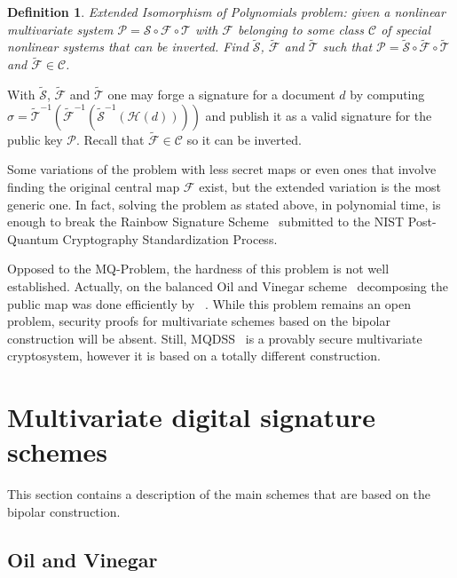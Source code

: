 \documentclass{ufsctex/ufsctex}
\newtheorem{definition}{Definition}
\begin{document}
\begin{definition}
Extended Isomorphism of Polynomials problem: given a nonlinear multivariate
system $\mathcal{P} = \mathcal{S} \circ \mathcal{F} \circ \mathcal{T}$ with
$\mathcal{F}$ belonging to some class $\mathcal{C}$ of special nonlinear
systems that can be inverted. Find $\tilde{\mathcal{S}}$, $\tilde{\mathcal{F}}$
and $\tilde{\mathcal{T}}$ such that $\mathcal{P} = \tilde{\mathcal{S}} \circ
\tilde{\mathcal{F}} \circ \tilde{\mathcal{T}}$ and $\tilde{\mathcal{F}} \in
\mathcal{C}$.
\end{definition}

With $\tilde{\mathcal{S}}$, $\tilde{\mathcal{F}}$ and $\tilde{\mathcal{T}}$ one
may forge a signature for a document $d$ by computing $\sigma =
\tilde{\mathcal{T}}^{-1}(\tilde{\mathcal{F}}^{-1}(\tilde{\mathcal{S}}^{-1}(
\mathcal{H}(d))))$ and publish it as a valid signature for the public key
$\mathcal{P}$. Recall that $\tilde{\mathcal{F}} \in \mathcal{C}$ so it can be
inverted.

Some variations of the problem with less secret maps or even ones that involve
finding the original central map $\mathcal{F}$ exist, but the extended
variation is the most generic one. In fact, solving the problem as stated
above, in polynomial time, is enough to break the Rainbow Signature
Scheme~\cite{ding2005rainbow} submitted to the NIST Post-Quantum Cryptography
Standardization Process.

Opposed to the MQ-Problem, the hardness of this problem is not well
established. Actually, on the balanced Oil and Vinegar
scheme~\cite{patarin1997ov} decomposing the public map was done efficiently by
~\cite{kipnis1998cryptanalysis}. While this problem remains an open problem,
security proofs for multivariate schemes based on the bipolar construction will
be absent. Still, MQDSS~\cite{chen20165} is a provably secure multivariate cryptosystem,
however it is based on a totally different construction.

\section{Multivariate digital signature schemes}\label{sec:mqschemes}

This section contains a description of the main schemes that are based on the
bipolar construction.

\subsection{Oil and Vinegar}\label{sec:ov}
\end{document}
